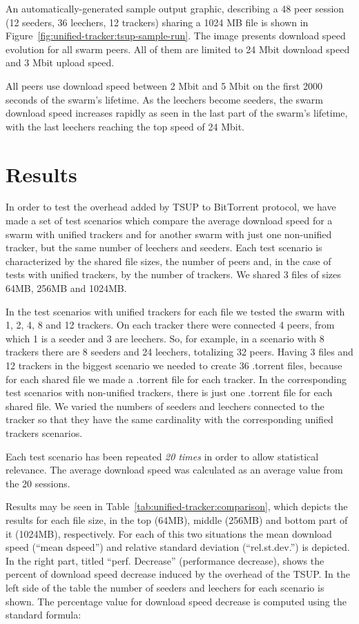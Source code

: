An automatically-generated sample output graphic, describing a 48 peer session
(12 seeders, 36 leechers, 12 trackers) sharing a 1024 MB file is shown in
Figure~\ref{fig:unified-tracker:tsup-sample-run}. The image presents download
speed evolution for all swarm peers. All of them are limited to 24 Mbit
download speed and 3 Mbit upload speed.

All peers use download speed between 2 Mbit and 5 Mbit on the first 2000
seconds of the swarm's lifetime. As the leechers become seeders, the swarm
download speed increases rapidly as seen in the last part of the swarm's
lifetime, with the last leechers reaching the top speed of 24 Mbit.

\section{Results}
\label{sec:unified-tracker:results}

In order to test the overhead added by TSUP to BitTorrent protocol, we have
made a set of test scenarios which compare the average download speed for a
swarm with unified trackers and for another swarm with just one non-unified
tracker, but the same number of leechers and seeders. Each test scenario is
characterized by the shared file sizes, the number of peers and, in the case
of tests with unified trackers, by the number of trackers. We shared 3 files
of sizes 64MB, 256MB and 1024MB.

In the test scenarios with unified trackers for each file we tested the swarm
with 1, 2, 4, 8 and 12 trackers. On each tracker there were connected 4 peers,
from which 1 is a seeder and 3 are leechers. So, for example, in a scenario
with 8 trackers there are 8 seeders and 24 leechers, totalizing 32 peers.
Having 3 files and 12 trackers in the biggest scenario we needed to create 36
.torrent files, because for each shared file we made a .torrent file for each
tracker. In the corresponding test scenarios with non-unified trackers, there
is just one .torrent file for each shared file. We varied the numbers of
seeders and leechers connected to the tracker so that they have the same
cardinality with the corresponding unified trackers scenarios.

Each test scenario has been repeated \textit{20 times} in order to allow
statistical relevance. The average download speed was calculated as an average
value from the 20 sessions.

Results may be seen in Table~\ref{tab:unified-tracker:comparison}, which
depicts the results for each file size, in the top (64MB), middle (256MB) and
bottom part of it (1024MB), respectively. For each of this two situations the
mean download speed (``mean dspeed'') and relative standard deviation
(``rel.st.dev.'') is depicted. In the right part, titled ``perf. Decrease''
(performance decrease), shows the percent of download speed decrease induced
by the overhead of the TSUP. In the left side of the table the number of
seeders and leechers for each scenario is shown. The percentage value for
download speed decrease is computed using the standard formula:

